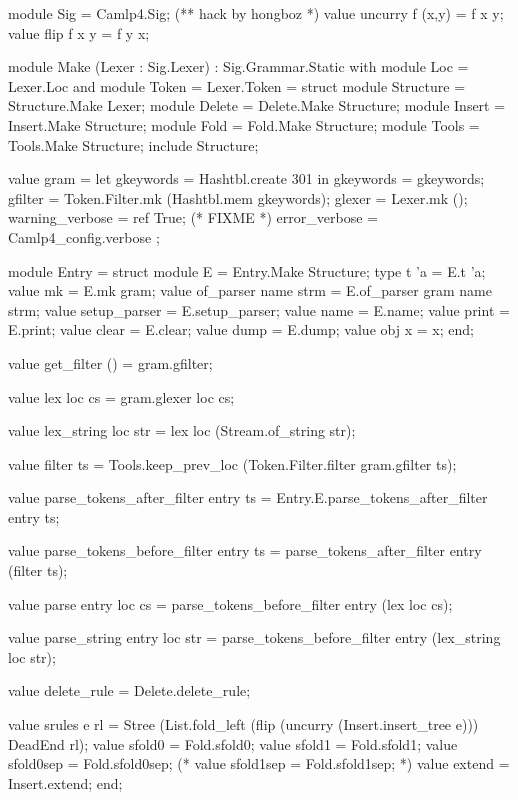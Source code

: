 \begin{ocamlcode}
module Sig = Camlp4.Sig; (** hack by hongboz *)
value uncurry f (x,y) = f x y;
value flip f x y = f y x;

module Make (Lexer : Sig.Lexer)
: Sig.Grammar.Static with module Loc = Lexer.Loc
                        and module Token = Lexer.Token
= struct
  module Structure = Structure.Make Lexer;
  module Delete = Delete.Make Structure;
  module Insert = Insert.Make Structure;
  module Fold = Fold.Make Structure;
  module Tools = Tools.Make Structure;
  include Structure;

  value gram =
    let gkeywords = Hashtbl.create 301 in
    {
      gkeywords = gkeywords;
      gfilter = Token.Filter.mk (Hashtbl.mem gkeywords);
      glexer = Lexer.mk ();
      warning_verbose = ref True; (* FIXME *)
      error_verbose = Camlp4_config.verbose
    };

  module Entry = struct
    module E = Entry.Make Structure;
    type t 'a = E.t 'a;
    value mk = E.mk gram;
    value of_parser name strm = E.of_parser gram name strm;
    value setup_parser = E.setup_parser;
    value name = E.name;
    value print = E.print;
    value clear = E.clear;
    value dump = E.dump;
    value obj x = x;
  end;

  value get_filter () = gram.gfilter;

  value lex loc cs = gram.glexer loc cs;

  value lex_string loc str = lex loc (Stream.of_string str);

  value filter ts = Tools.keep_prev_loc (Token.Filter.filter gram.gfilter ts);

  value parse_tokens_after_filter entry ts = Entry.E.parse_tokens_after_filter entry ts;

  value parse_tokens_before_filter entry ts = parse_tokens_after_filter entry (filter ts);

  value parse entry loc cs = parse_tokens_before_filter entry (lex loc cs);

  value parse_string entry loc str = parse_tokens_before_filter entry (lex_string loc str);

  value delete_rule = Delete.delete_rule;

  value srules e rl =
    Stree (List.fold_left (flip (uncurry (Insert.insert_tree e))) DeadEnd rl);
  value sfold0 = Fold.sfold0;
  value sfold1 = Fold.sfold1;
  value sfold0sep = Fold.sfold0sep;
  (* value sfold1sep = Fold.sfold1sep; *)
  value extend = Insert.extend;
end;
\end{ocamlcode}

